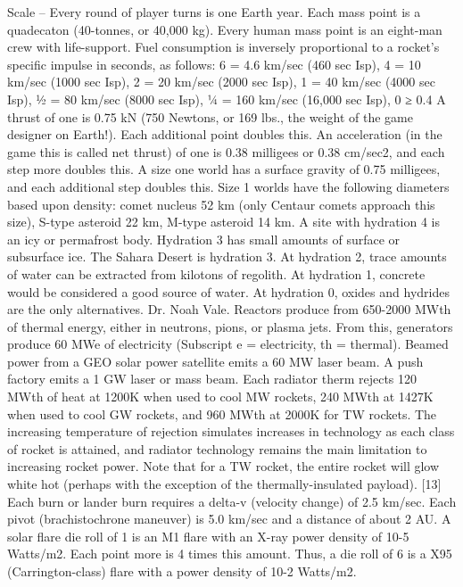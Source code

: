 \documentclass[a4paper]{book}
\begin{document}
Scale –
Every round of player turns is one Earth year.
Each mass point is a quadecaton (40-tonnes, or 40,000 kg).
Every human mass point is an eight-man crew with life-support.
Fuel consumption is inversely proportional to a rocket’s specific impulse in seconds, as follows: 6 = 4.6 km/sec (460 sec Isp), 4 = 10 km/sec (1000 sec Isp), 2 = 20 km/sec (2000 sec Isp), 1 = 40 km/sec (4000 sec Isp), ½ = 80 km/sec (8000 sec Isp), ¼ = 160 km/sec (16,000 sec Isp), 0 ≥ 0.4%
A thrust of one is 0.75 kN (750 Newtons, or 169 lbs., the weight of the game designer on Earth!). Each additional point doubles this.
An acceleration (in the game this is called net thrust) of one is 0.38 milligees or 0.38 cm/sec2, and each step more doubles this.
A size one world has a surface gravity of 0.75 milligees, and each additional step doubles this. Size 1 worlds have the following diameters based upon density: comet nucleus 52 km (only Centaur comets approach this size), S-type asteroid 22 km, M-type asteroid 14 km.
A site with hydration 4 is an icy or permafrost body. Hydration 3 has small amounts of surface or subsurface ice. The Sahara Desert is hydration 3. At hydration 2, trace amounts of water can be extracted from kilotons of regolith. At hydration 1, concrete would be considered a good source of water. At hydration 0, oxides and hydrides are the only alternatives. Dr. Noah Vale.
Reactors produce from 650-2000 MWth of thermal energy, either in neutrons, pions, or plasma jets. From this, generators produce 60 MWe of electricity (Subscript e = electricity, th = thermal).
Beamed power from a GEO solar power satellite emits a 60 MW laser beam. A push factory emits a 1 GW laser or mass beam.
Each radiator therm rejects 120 MWth of heat at 1200K when used to cool MW rockets, 240 MWth at 1427K when used to cool GW rockets, and 960 MWth at 2000K for TW rockets. The increasing temperature of rejection simulates increases in technology as each class of rocket is attained, and radiator technology remains the main limitation to increasing rocket power. Note that for a TW rocket, the entire rocket will glow white hot (perhaps with the exception of the thermally-insulated payload). [13]
Each burn or lander burn requires a delta-v (velocity change) of 2.5 km/sec. Each pivot (brachistochrone maneuver) is 5.0 km/sec and a distance of about 2 AU.
A solar flare die roll of 1 is an M1 flare with an X-ray power density of 10-5 Watts/m2.  Each point more is 4 times this amount. Thus, a die roll of 6 is a X95 (Carrington-class) flare with a power density of 10-2 Watts/m2.
\end{document}
